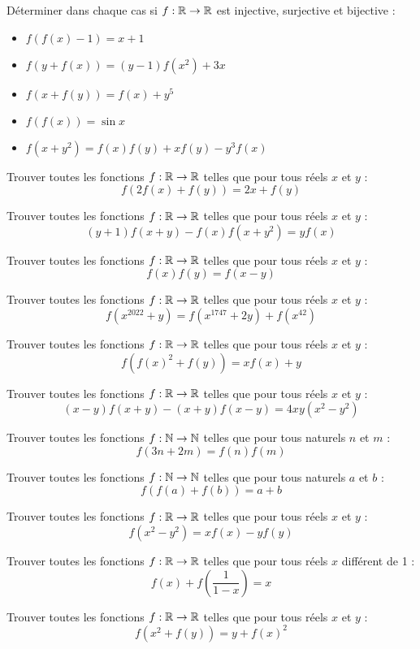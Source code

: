 \begin{exo}
Déterminer dans chaque cas si $f:\mathbb R\to\mathbb R$ est injective, surjective et bijective :
\begin{itemize}
    \item $f(f(x)-1)=x+1$
    \item $f(y+f(x))=(y-1)f(x^2)+3x$
    \item $f(x+f(y))=f(x)+y^5$
    \item $f(f(x))=\sin x$
    \item $f(x+y^2)=f(x)f(y)+xf(y)-y^3f(x)$
\end{itemize}

\end{exo}
\begin{exo}
Trouver toutes les fonctions $f:\mathbb R\to\mathbb R$ telles que pour tous réels $x$ et $y$ :
$$f(2f(x)+f(y))=2x+f(y)$$
\end{exo}
\begin{exo}
Trouver toutes les fonctions $f:\mathbb R\to\mathbb R$ telles que pour tous réels $x$ et $y$ :
$$(y+1)f(x+y)-f(x)f(x+y^2)=yf(x)$$
\end{exo}
\begin{exo}
Trouver toutes les fonctions $f:\mathbb R\to\mathbb R$ telles que pour tous réels $x$ et $y$ :
$$f(x)f(y)=f(x-y)$$
\end{exo}

\begin{exo}
Trouver toutes les fonctions $f:\mathbb R\to\mathbb R$ telles que pour tous réels $x$ et $y$ :
$$f(x^{2022}+y)=f(x^{1747}+2y)+f(x^{42})$$
\end{exo}
\begin{exo}
Trouver toutes les fonctions $f:\mathbb R\to\mathbb R$ telles que pour tous réels $x$ et $y$ :
$$f(f(x)^2+f(y))=xf(x)+y$$
\end{exo}
\begin{exo}
Trouver toutes les fonctions $f:\mathbb R\to\mathbb R$ telles que pour tous réels $x$ et $y$ :
$$(x-y)f(x+y)-(x+y)f(x-y)=4xy(x^2-y^2)$$
\end{exo}
\begin{exo}
Trouver toutes les fonctions $f:\mathbb N\to\mathbb N$ telles que pour tous naturels $n$ et $m$ :
$$f(3n+2m)=f(n)f(m)$$
\end{exo}
\begin{exo}
Trouver toutes les fonctions $f:\mathbb N\to\mathbb N$ telles que pour tous naturels $a$ et $b$ :
$$f(f(a)+f(b))=a+b$$
\end{exo}
\begin{exo}
Trouver toutes les fonctions $f:\mathbb R\to\mathbb R$ telles que pour tous réels $x$ et $y$ :
$$f(x^2-y^2)=xf(x)-yf(y)$$
\end{exo}
\begin{exo}
Trouver toutes les fonctions $f:\mathbb R\to\mathbb R$ telles que pour tous réels $x$ différent de 1 :
$$f(x)+f\left(\frac1{1-x}\right)=x$$
\end{exo}
\begin{exo}
Trouver toutes les fonctions $f:\mathbb R\to\mathbb R$ telles que pour tous réels $x$ et $y$ :
$$f(x^2+f(y))=y+f(x)^2$$
\end{exo}
